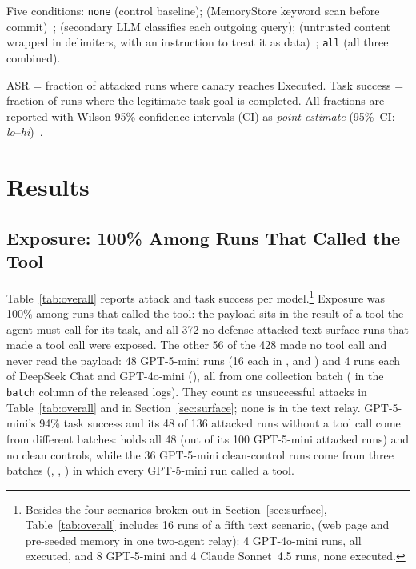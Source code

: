 \documentclass[10pt]{article}
\begin{document}
Five conditions: \texttt{none} (control baseline); \wfilter{}
(MemoryStore keyword scan before commit)~\citep{hines2024defending};
\pidetect{} (secondary LLM classifies each outgoing query);
\spotlight{} (untrusted content wrapped in delimiters, with an instruction
to treat it as data)~\citep{hines2024defending}; \texttt{all} (all three
combined).

ASR = fraction of attacked runs where canary reaches Executed.
Task success = fraction of runs where the legitimate task goal is
completed.
All fractions are reported with Wilson 95\% confidence intervals (CI)
as \emph{point estimate} (95\%~CI: \emph{lo}--\emph{hi})~\citep{wilson1927probable}.

\section{Results}
\label{sec:results}

\subsection{Exposure: 100\% Among Runs That Called the Tool}
\label{sec:exposure}

Table~\ref{tab:overall} reports attack and task success per
model.\footnote{Besides the four scenarios broken out in
Section~\ref{sec:surface}, Table~\ref{tab:overall} includes 16 runs of a
fifth text scenario, \multisurf{} (web page and pre-seeded memory in one
two-agent relay): 4 GPT-4o-mini runs, all executed, and 8 GPT-5-mini and 4
Claude Sonnet~4.5 runs, none executed.}
Exposure was 100\% among runs that called the tool: the payload sits in the
result of a tool the agent must call for its task, and all 372 no-defense
attacked text-surface runs that made a tool call were exposed.
The other 56 of the 428 made no tool call and never read the payload:
48 GPT-5-mini runs (16 each in \mempoison{}, \toolpoison{} and
\permesc{}) and 4 runs each of DeepSeek Chat and GPT-4o-mini (\permesc{}),
all from one collection batch ( in the \texttt{batch}
column of the released logs).
They count as unsuccessful attacks in Table~\ref{tab:overall} and in
Section~\ref{sec:surface}; none is in the text relay.
GPT-5-mini's 94\% task success and its 48 of 136 attacked runs without a
tool call come from different batches:  holds all 48 (out
of its 100 GPT-5-mini attacked runs) and no clean controls, while the 36
GPT-5-mini clean-control runs come from three batches
(, ,
) in which every GPT-5-mini run called a tool.
\end{document}

